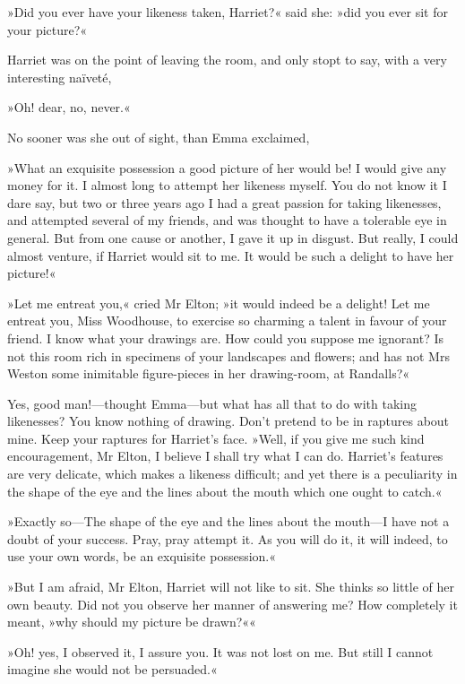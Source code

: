 »Did you ever have your likeness taken, Harriet?« said she: »did you ever sit for your picture?«

Harriet was on the point of leaving the room, and only stopt to say, with a very interesting naïveté,

»Oh! dear, no, never.«

No sooner was she out of sight, than Emma exclaimed,

»What an exquisite possession a good picture of her would be! I would give any money for it. I almost long to attempt her likeness myself. You do not know it I dare say, but two or three years ago I had a great passion for taking likenesses, and attempted several of my friends, and was thought to have a tolerable eye in general. But from one cause or another, I gave it up in disgust. But really, I could almost venture, if Harriet would sit to me. It would be such a delight to have her picture!«

»Let me entreat you,« cried Mr Elton; »it would indeed be a delight! Let me entreat you, Miss Woodhouse, to exercise so charming a talent in favour of your friend. I know what your drawings are. How could you suppose me ignorant? Is not this room rich in specimens of your landscapes and flowers; and has not Mrs Weston some inimitable figure-pieces in her drawing-room, at Randalls?«

Yes, good man!—thought Emma—but what has all that to do with taking likenesses? You know nothing of drawing. Don't pretend to be in raptures about mine. Keep your raptures for Harriet's face. »Well, if you give me such kind encouragement, Mr Elton, I believe I shall try what I can do. Harriet's features are very delicate, which makes a likeness difficult; and yet there is a peculiarity in the shape of the eye and the lines about the mouth which one ought to catch.«

»Exactly so—The shape of the eye and the lines about the mouth—I have not a doubt of your success. Pray, pray attempt it. As you will do it, it will indeed, to use your own words, be an exquisite possession.«

»But I am afraid, Mr Elton, Harriet will not like to sit. She thinks so little of her own beauty. Did not you observe her manner of answering me? How completely it meant, »why should my picture be drawn?««

»Oh! yes, I observed it, I assure you. It was not lost on me. But still I cannot imagine she would not be persuaded.«

